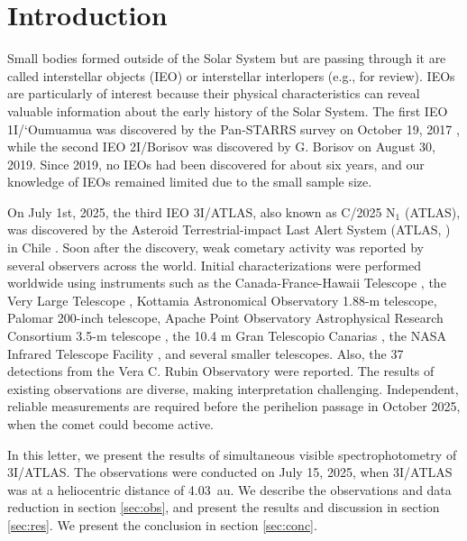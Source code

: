 \documentclass[]{pasj02}
\newcommand\I{3I/ATLAS\xspace}
\begin{document}
\section{Introduction}
Small bodies formed outside of the Solar System but are passing through it are called interstellar objects (IEO) or interstellar interlopers (e.g., \cite{Jewitt2023} for review).
IEOs are particularly of interest 
because their physical characteristics can reveal valuable information about the early history of the Solar System.
The first IEO 1I/`Oumuamua was discovered by the Pan-STARRS survey \citep{Chambers2016} on October 19, 2017 \citep{Meech2017}, while the second IEO 2I/Borisov was discovered by G. Borisov on August 30, 2019.
Since 2019, no IEOs had been discovered for about six years, and our knowledge of IEOs remained limited due to the small sample size.

On July 1st, 2025, the third IEO 3I/ATLAS, also known as C/2025 N$_1$ (ATLAS), was discovered by the Asteroid Terrestrial-impact Last Alert System (ATLAS, \cite{Tonry2018}) in Chile \citep{Denneau2025}.
Soon after the discovery, weak cometary activity was reported by several observers across the world.
Initial characterizations were performed worldwide using instruments such as the Canada-France-Hawaii Telescope  \citep{Seligman2025_3I}, the Very Large Telescope \citep{Seligman2025_3I, Opitom2025_3I, Alvarez-Candal2025_3I}, 
Kottamia Astronomical Observatory 1.88-m telescope, Palomar 200-inch telescope, Apache Point Observatory Astrophysical Research Consortium 3.5-m telescope \citep{Bolin2025_3I, Belyakov2025_3I}, the 10.4 m Gran Telescopio Canarias \citep{Marcos2025_3I}, the NASA Infrared Telescope Facility \citep{Kareta2025_3I}, and several smaller telescopes.
Also, the 37 detections from the Vera C. Rubin Observatory were reported.
The results of existing observations are diverse, making interpretation challenging.
Independent, reliable measurements are required before the perihelion passage in October 2025, when the comet could become active.

In this letter, we present the results of simultaneous visible spectrophotometry of \I.
The observations were conducted on July 15, 2025, when \I was at a heliocentric distance of 4.03~au.
We describe the observations and data reduction in section \ref{sec:obs}, and present the results and discussion in section \ref{sec:res}.
We present the conclusion in section \ref{sec:conc}.
\end{document}
